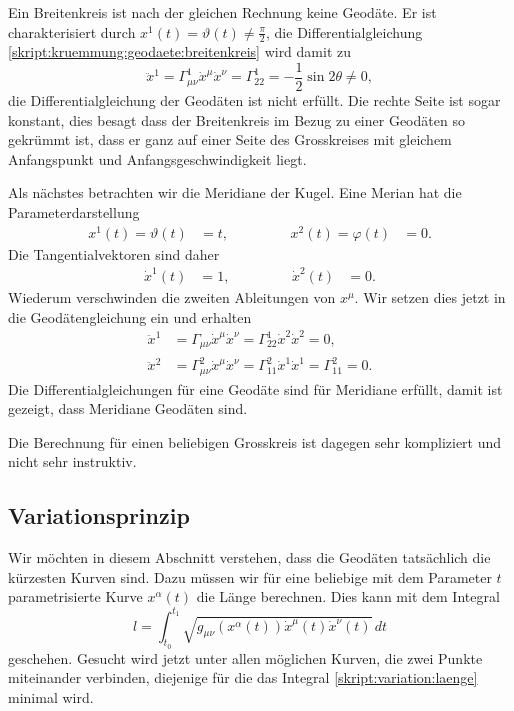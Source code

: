 Ein Breitenkreis ist nach der gleichen Rechnung keine Geodäte.
Er ist charakterisiert durch $x^1(t)=\vartheta(t)\ne\frac{\pi}2$,
die Differentialgleichung
\eqref{skript:kruemmung:geodaete:breitenkreis}
wird damit zu
\[
\ddot x^1
=
\Gamma_{\mu\nu}^1\dot x^\mu\dot x^\nu=\Gamma_{22}^1=-\frac12\sin2\theta
\ne
0,
\]
die Differentialgleichung der Geodäten ist nicht erfüllt.
Die rechte Seite ist sogar konstant, dies besagt dass der Breitenkreis
im Bezug zu einer Geodäten so gekrümmt ist, dass er ganz
auf einer Seite des Grosskreises mit gleichem Anfangspunkt und
Anfangsgeschwindigkeit liegt.

Als nächstes betrachten wir die Meridiane der Kugel.
Eine Merian hat die Parameterdarstellung
\[
\begin{aligned}
x^1(t)=\vartheta(t)&=t,
&\qquad&&
x^2(t)=\varphi(t)&=0.
\end{aligned}
\]
Die Tangentialvektoren sind daher
\[
\begin{aligned}
\dot x^1(t)&=1,
&\qquad&&
\dot x^2(t)&=0.
\end{aligned}
\]
Wiederum verschwinden
die zweiten Ableitungen von $x^\mu$.
Wir setzen dies jetzt in die Geodäten\-gleichung ein und erhalten
\begin{align*}
\ddot x^1
&=
\Gamma_{\mu\nu}\dot x^\mu \dot x^\nu
=
\Gamma_{22}^1\dot x^2 \dot x^2=0,
\\
\ddot x^2
&=
\Gamma_{\mu\nu}^2\dot x^\mu \dot x^\nu
=
\Gamma_{11}^2\dot x^1\dot x^1=\Gamma_{11}^2=0.
\end{align*}
Die Differentialgleichungen für eine Geodäte sind für Meridiane erfüllt,
damit ist gezeigt, dass Meridiane Geodäten sind.

Die Berechnung für einen beliebigen Grosskreis ist dagegen sehr 
kompliziert und nicht sehr instruktiv.

\subsection{Variationsprinzip}
Wir möchten in diesem Abschnitt verstehen, dass die Geodäten tatsächlich 
die kürzesten Kurven sind.
Dazu müssen wir für eine beliebige mit dem Parameter $t$ parametrisierte
Kurve $x^\alpha(t)$ die Länge berechnen.
Dies kann mit dem Integral
\begin{equation}
l=\int_{t_0}^{t_1} \sqrt{g_{\mu\nu}(x^\alpha(t)) \dot x^\mu(t)\dot x^\nu(t)}\,dt
\label{skript:variation:laenge}
\end{equation}
geschehen.
Gesucht wird jetzt unter allen möglichen Kurven, die zwei Punkte miteinander
verbinden, diejenige für die das Integral \eqref{skript:variation:laenge}
minimal wird.

